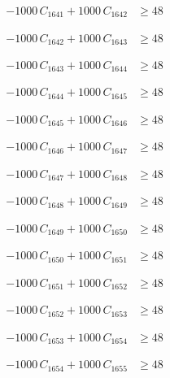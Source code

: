 \documentclass[a4paper,11pt]{article}
\begin{document}
\begin{align}
-1000\,C_{1641} + 1000\,C_{1642} &\geq 48 \nonumber
\end{align}

\begin{align}
-1000\,C_{1642} + 1000\,C_{1643} &\geq 48 \nonumber
\end{align}

\begin{align}
-1000\,C_{1643} + 1000\,C_{1644} &\geq 48 \nonumber
\end{align}

\begin{align}
-1000\,C_{1644} + 1000\,C_{1645} &\geq 48 \nonumber
\end{align}

\begin{align}
-1000\,C_{1645} + 1000\,C_{1646} &\geq 48 \nonumber
\end{align}

\begin{align}
-1000\,C_{1646} + 1000\,C_{1647} &\geq 48 \nonumber
\end{align}

\begin{align}
-1000\,C_{1647} + 1000\,C_{1648} &\geq 48 \nonumber
\end{align}

\begin{align}
-1000\,C_{1648} + 1000\,C_{1649} &\geq 48 \nonumber
\end{align}

\begin{align}
-1000\,C_{1649} + 1000\,C_{1650} &\geq 48 \nonumber
\end{align}

\begin{align}
-1000\,C_{1650} + 1000\,C_{1651} &\geq 48 \nonumber
\end{align}

\begin{align}
-1000\,C_{1651} + 1000\,C_{1652} &\geq 48 \nonumber
\end{align}

\begin{align}
-1000\,C_{1652} + 1000\,C_{1653} &\geq 48 \nonumber
\end{align}

\begin{align}
-1000\,C_{1653} + 1000\,C_{1654} &\geq 48 \nonumber
\end{align}

\begin{align}
-1000\,C_{1654} + 1000\,C_{1655} &\geq 48 \nonumber
\end{align}
\end{document}
